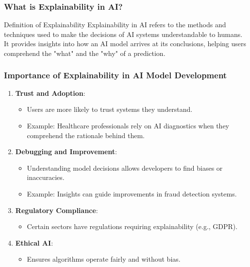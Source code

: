 \documentclass[aspectratio=169]{beamer}
\begin{document}
\begin{frame}[fragile]
    \frametitle{What is Explainability in AI?}
    \begin{block}{Definition of Explainability}
        Explainability in AI refers to the methods and techniques used to make the decisions of AI systems understandable to humans. It provides insights into how an AI model arrives at its conclusions, helping users comprehend the "what" and the "why" of a prediction.
    \end{block}
\end{frame}

\begin{frame}[fragile]
    \frametitle{Importance of Explainability in AI Model Development}
    \begin{enumerate}
        \item \textbf{Trust and Adoption}:
        \begin{itemize}
            \item Users are more likely to trust systems they understand.
            \item Example: Healthcare professionals rely on AI diagnostics when they comprehend the rationale behind them.
        \end{itemize}
        
        \item \textbf{Debugging and Improvement}:
        \begin{itemize}
            \item Understanding model decisions allows developers to find biases or inaccuracies.
            \item Example: Insights can guide improvements in fraud detection systems.
        \end{itemize}

        \item \textbf{Regulatory Compliance}:
        \begin{itemize}
            \item Certain sectors have regulations requiring explainability (e.g., GDPR).
        \end{itemize}
        
        \item \textbf{Ethical AI}:
        \begin{itemize}
            \item Ensures algorithms operate fairly and without bias.
        \end{itemize}
    \end{enumerate}
\end{frame}
\end{document}

